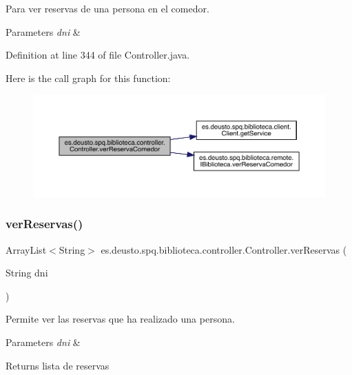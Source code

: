 Para ver reservas de una persona en el comedor. 
\begin{DoxyParams}{Parameters}
{\em dni} & \\
\hline
\end{DoxyParams}


Definition at line 344 of file Controller.\+java.

Here is the call graph for this function\+:
\nopagebreak
\begin{figure}[H]
\begin{center}
\leavevmode
\includegraphics[width=350pt]{classes_1_1deusto_1_1spq_1_1biblioteca_1_1controller_1_1_controller_a75d13ac6d80a603e7d8c5482409580d7_cgraph}
\end{center}
\end{figure}
\mbox{\label{classes_1_1deusto_1_1spq_1_1biblioteca_1_1controller_1_1_controller_aaf010f5a789f146044b4a68a55d8003b}} 
\subsubsection{\texorpdfstring{ver\+Reservas()}{verReservas()}}
{\footnotesize\ttfamily Array\+List$<$String$>$ es.\+deusto.\+spq.\+biblioteca.\+controller.\+Controller.\+ver\+Reservas (\begin{DoxyParamCaption}\item[{String}]{dni }\end{DoxyParamCaption})}

Permite ver las reservas que ha realizado una persona. 
\begin{DoxyParams}{Parameters}
{\em dni} & \\
\hline
\end{DoxyParams}
\begin{DoxyReturn}{Returns}
lista de reservas 
\end{DoxyReturn}


